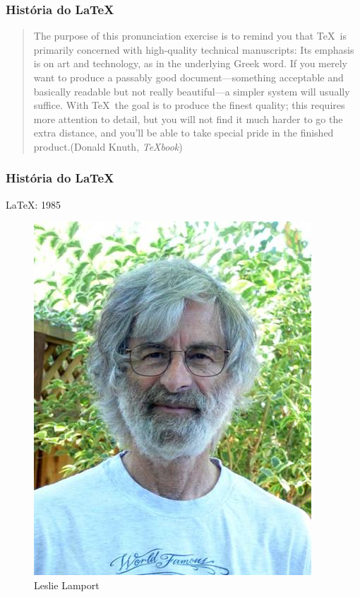 \begin{frame}
  \frametitle{História do LaTeX}
  \LARGE
\end{frame}

\begin{frame}
  \large
  \begin{quote}
    The purpose of this pronunciation exercise is to remind you that \TeX\ is primarily concerned with high-quality technical manuscripts: Its emphasis is on art and technology, as in the underlying Greek word. If you merely want to produce a passably good document—something acceptable and basically readable but not really beautiful—a simpler system will usually suffice. With \TeX\ the goal is to produce the finest quality; this requires more attention to detail, but you will not find it much harder to go the extra distance, and you’ll be able to take special pride in the finished product.\hfill (Donald Knuth, \emph{\TeX book})
  \end{quote}
\end{frame}

\begin{frame}
  \frametitle{História do LaTeX}
  \LARGE
  \LaTeX: 1985
\end{frame}

\begin{frame}[plain]
  \begin{figure}[h]
    \includegraphics[scale=.5]{img/lamport}
    \caption{Leslie Lamport}
  \end{figure}
\end{frame}
